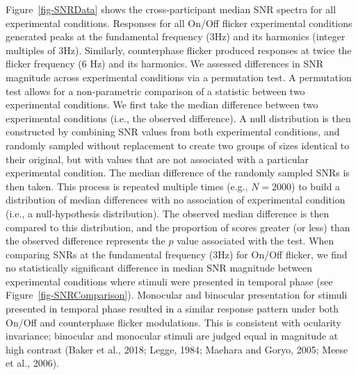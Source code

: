 \documentclass[
  12pt,
]{article}
\begin{document}
Figure~\ref{fig-SNRData} shows the cross-participant median SNR spectra
for all experimental conditions. Responses for all On/Off flicker
experimental conditions generated peaks at the fundamental frequency
(3Hz) and its harmonics (integer multiples of 3Hz). Similarly,
counterphase flicker produced responses at twice the flicker frequency
(6 Hz) and its harmonics. We assessed differences in SNR magnitude
across experimental conditions via a permutation test. A permutation
test allows for a non-parametric comparison of a statistic between two
experimental conditions. We first take the median difference between two
experimental conditions (i.e., the observed difference). A null
distribution is then constructed by combining SNR values from both
experimental conditions, and randomly sampled without replacement to
create two groups of sizes identical to their original, but with values
that are not associated with a particular experimental condition. The
median difference of the randomly sampled SNRs is then taken. This
process is repeated multiple times (e.g., \(N = 2000\)) to build a
distribution of median differences with no association of experimental
condition (i.e., a null-hypothesis distribution). The observed median
difference is then compared to this distribution, and the proportion of
scores greater (or less) than the observed difference represents the
\(p\) value associated with the test. When comparing SNRs at the
fundamental frequency (3Hz) for On/Off flicker, we find no statistically
significant difference in median SNR magnitude between experimental
conditions where stimuli were presented in temporal phase (see
Figure~\ref{fig-SNRComparison}). Monocular and binocular presentation
for stimuli presented in temporal phase resulted in a similar response
pattern under both On/Off and counterphase flicker modulations. This is
consistent with ocularity invariance; binocular and monocular stimuli
are judged equal in magnitude at high contrast (Baker et al., 2018;
Legge, 1984; Maehara and Goryo, 2005; Meese et al., 2006).
\end{document}
